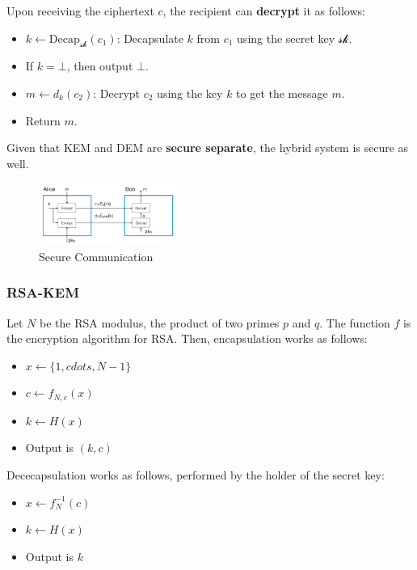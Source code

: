 Upon receiving the ciphertext \( c \), the recipient can \textbf{decrypt} it as follows:

\begin{itemize}
    \item \( k \leftarrow \text{Decap}_{\mathcal{sk}}(c_1) \): Decapsulate \( k \) from \( c_1 \) using the secret key \( \mathcal{sk} \).
    \item If \( k = \bot \), then output \( \bot \).
    \item \( m \leftarrow d_k(c_2) \): Decrypt \( c_2 \) using the key \( k \) to get the message \( m \).
    \item Return \( m \).
\end{itemize}

Given that KEM and DEM are \textbf{secure separate}, the hybrid system is secure as well.

\begin{figure}[h!]
    \centering
    \includegraphics[width=0.4\textwidth]{img/securecom.png}
    \caption{Secure Communication}
\end{figure}

\subsubsection{RSA-KEM}
Let $N$ be the RSA modulus, the product of two primes $p$ and $q$.
The function $f$ is the encryption algorithm for RSA.
Then, encapsulation works as follows:

\begin{itemize}
    \item $x \leftarrow \{1, cdots, N-1 \}$
    \item $c \leftarrow f_{N,e}(x)$
    \item $k \leftarrow H(x)$
    \item Output is $(k,c)$
\end{itemize}

Dececapsulation works as follows, performed by the holder of the secret key:

\begin{itemize}
    \item $x \leftarrow f_{N}^{-1}(c)$
    \item $k \leftarrow H(x)$
    \item Output is $k$
\end{itemize}

